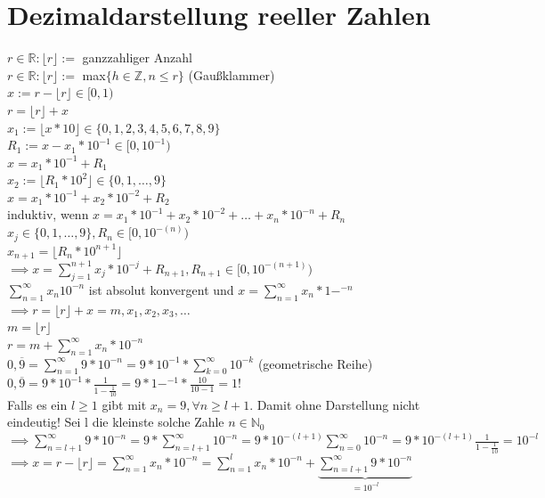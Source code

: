 \documentclass[fleqn]{scrbook}
\begin{document}
\section{Dezimaldarstellung reeller Zahlen}
$r\in\mathbb{R}:\lfloor r \rfloor :=$ ganzzahliger Anzahl\\
$r\in\mathbb{R}:\lfloor r \rfloor :=$ max$\{h\in\mathbb{Z}, n \leq r\}$ (Gaußklammer)\\
$x := r - \lfloor r \rfloor \in [0,1)$\\
$r = \lfloor r \rfloor + x$\\
$x_1 := \lfloor x * 10 \rfloor \in \{0,1,2,3,4,5,6,7,8,9\}$\\
$R_1 := x - x_1 * 10^{-1} \in [0,10^{-1})$\\
$x=x_1*10^{-1} + R_1$\\
$x_2 := \lfloor R_1 * 10^2 \rfloor \in \{0,1,\ldots ,9\}$\\
$x = x_1 * 10^{-1} + x_2 * 10^{-2} + R_2$\\
induktiv, wenn $x = x_1 * 10^{-1} + x_2 * 10^{-2} + \ldots + x_n * 10^{-n} + R_n$\\
$x_j \in \{0,1,\ldots,9\}, R_n \in [0,10^{-(n)})$\\
$x_{n+1} = \lfloor R_n * 10^{n+1} \rfloor$\\
$\implies x=\sum_{j=1}^{n+1} x_j * 10^{-j} + R_{n+1}, R_{n+1} \in [0,10^{-(n+1)})$\\
$\sum_{n=1}^\infty x_n 10^{-n}$ ist absolut konvergent und $x=\sum_{n=1}^\infty x_n * 1-^{-n}$\\
$\implies r = \lfloor r \rfloor + x = m,x_1,x_2,x_3,\ldots$\\
$m = \lfloor r \rfloor$\\
$r = m + \sum_{n=1}^\infty x_n * 10^{-n}$\\
$0,\overline{9} = \sum_{n=1}^\infty	9 * 10^{-n} = 9 * 10^{-1} * \sum_{k=0}^\infty 10^{-k}$ (geometrische Reihe)\\
$0,\overline{9} = 9 * 10^{-1} * \frac{1}{1-\frac{1}{10}} = 9 * 1-^{-1} * \frac{10}{10-1} = 1$!\\
Falls es ein $l \geq 1$ gibt mit $x_n = 9, \forall n \geq l + 1$. Damit ohne Darstellung nicht eindeutig! Sei l die kleinste solche Zahle $n\in\mathbb{N}_0$\\
$\implies \sum_{n=l+1}^\infty 9 * 10^{-n} = 9 * \sum_{n=l+1}^\infty 10^{-n} = 9 * 10 ^{-(l+1)} \sum_{n=0}^\infty 10^{-n} = 9 * 10^{-(l+1)} \frac{1}{1-\frac{1}{10}} = 10^{-l}$\\
$\implies x = r - \lfloor r \rfloor = \sum_{n=1}^\infty x_n * 10^{-n} = \sum_{n=1}^l x_n * 10^{-n} + \underbrace{\sum_{n=l+1}^\infty 9 * 10^{-n}}_{=10^{-l}}$\\
\end{document}
